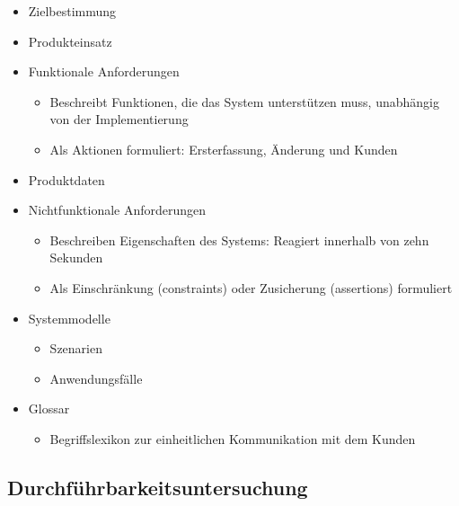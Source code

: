 \documentclass[parskip=full, 12pt]{scrartcl}
\begin{document}
			\begin{itemize}
				\item Zielbestimmung
				\item Produkteinsatz
				\item Funktionale Anforderungen
				\begin{itemize}
					\item Beschreibt Funktionen, die das System unterstützen muss, unabhängig von der Implementierung
					\item Als Aktionen formuliert: \dq Ersterfassung, Änderung und Kunden\dq
				\end{itemize}
				\item Produktdaten
				\item Nichtfunktionale Anforderungen
				\begin{itemize}
					\item Beschreiben Eigenschaften des Systems: \dq Reagiert innerhalb von zehn Sekunden\dq
					\item Als Einschränkung (constraints) oder Zusicherung (assertions) formuliert
				\end{itemize}
				\item Systemmodelle
				\begin{itemize}
					\item Szenarien
					\item Anwendungsfälle
				\end{itemize}
				\item Glossar
				\begin{itemize}
					\item Begriffslexikon zur einheitlichen Kommunikation mit dem Kunden
				\end{itemize}
			\end{itemize}
		
		\subsection{Durchführbarkeitsuntersuchung}
			
\end{document}
